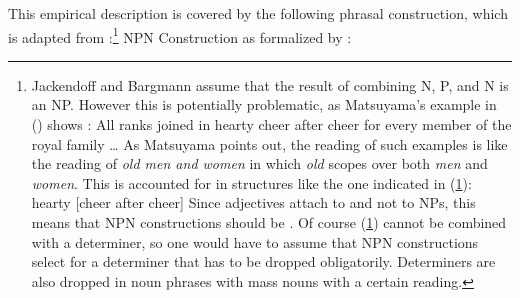 \documentclass[output=paper
	        ,collection
	        ,collectionchapter
 	        ,biblatex
                ,babelshorthands
                ,newtxmath
                ,draftmode
                ,colorlinks, citecolor=brown
]{langscibook}
\begin{document}
This empirical description is covered by the following phrasal construction, which is adapted from
\citet{Bargmann2015a}:\footnote{%
Jackendoff and Bargmann assume that the result of combining N, P, and N is an NP. However this is
potentially problematic, as Matsuyama's example in () shows \citep[]{Matsuyama2004a}:
\ea
All ranks joined in hearty cheer after cheer for every member of the royal family \ldots
\z
As Matsuyama points out, the reading of such examples is like the reading of \emph{old men and women}
in which \emph{old} scopes over both \emph{men} and \emph{women}. This is accounted for in
structures like the one indicated in (\ref{ex-hearty-cheer-after-cheer}):
\ea
\label{ex-hearty-cheer-after-cheer}
hearty [cheer after cheer]
\z
Since adjectives attach to \nbars and not to NPs, this means that NPN constructions should be
\nbars. Of course (\ref{ex-hearty-cheer-after-cheer}) cannot be combined with a determiner, so one would have to assume that
NPN constructions select for a determiner that has to be dropped obligatorily. Determiners are also
dropped in noun phrases with mass nouns with a certain reading.
}
\ea
\label{ex-npn-bragmann}%
NPN Construction as formalized by \citet{Bargmann2015a}:\\
\end{document}
